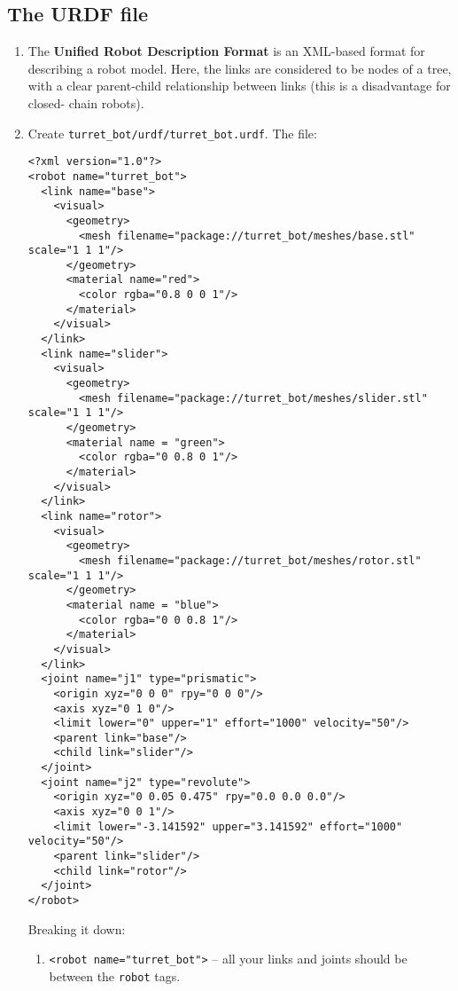 \documentclass{article}
\begin{document}
        \subsection{The URDF file}
            \begin{enumerate}
                \item The \textbf{Unified Robot Description Format} is an XML-based format for 
                describing a robot model. Here, the links are considered to be nodes of a tree,
                with a clear parent-child relationship between links (this is a disadvantage for closed-
                chain robots).  
                \item Create \texttt{turret\_bot/urdf/turret\_bot.urdf}. The file:
                \begin{verbatim}
<?xml version="1.0"?>
<robot name="turret_bot">
  <link name="base">
    <visual>
      <geometry>
        <mesh filename="package://turret_bot/meshes/base.stl" scale="1 1 1"/>
      </geometry> 
      <material name="red">
        <color rgba="0.8 0 0 1"/>    
      </material>  
    </visual>
  </link>
  <link name="slider">
    <visual>
      <geometry>
        <mesh filename="package://turret_bot/meshes/slider.stl" scale="1 1 1"/>
      </geometry>    
      <material name = "green">
        <color rgba="0 0.8 0 1"/>    
      </material>  
    </visual>
  </link>
  <link name="rotor">
    <visual>
      <geometry>
        <mesh filename="package://turret_bot/meshes/rotor.stl" scale="1 1 1"/>
      </geometry>
      <material name = "blue">
        <color rgba="0 0 0.8 1"/>    
      </material>      
    </visual>
  </link>
  <joint name="j1" type="prismatic">
    <origin xyz="0 0 0" rpy="0 0 0"/>
    <axis xyz="0 1 0"/>
    <limit lower="0" upper="1" effort="1000" velocity="50"/>
    <parent link="base"/>
    <child link="slider"/>
  </joint>
  <joint name="j2" type="revolute">
    <origin xyz="0 0.05 0.475" rpy="0.0 0.0 0.0"/>
    <axis xyz="0 0 1"/>
    <limit lower="-3.141592" upper="3.141592" effort="1000" velocity="50"/>
    <parent link="slider"/>
    <child link="rotor"/>
  </joint>
</robot>                    
                \end{verbatim}
                \newpage
                Breaking it down:
                \begin{enumerate}
                    \item \texttt{<robot name="turret_bot">} -- all your links and joints 
                    should be between the \texttt{robot} tags.

\end{enumerate}
\end{enumerate}
\end{document}
